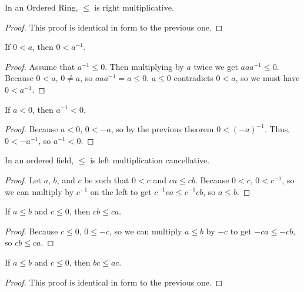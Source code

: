 \documentclass[../../math.tex]{subfiles}
\begin{document}
\begin{instance}
    In an Ordered Ring, $\leq$ is right multiplicative.
\end{instance}
\begin{proof}
    This proof is identical in form to the previous one.
\end{proof}

\begin{theorem}
    If $0 < a$, then $0 < a^{-1}$.
\end{theorem}
\begin{proof}
    Assume that $a^{-1} \leq 0$. Then multiplying by $a$ twice we get $aaa^{-1}
    \leq 0$.  Because $0 < a$, $0 \neq a$, so $aaa^{-1} = a \leq 0$.  $a \leq 0$
    contradicts $0 < a$, so we must have $0 < a^{-1}$.
\end{proof}

\begin{theorem}
    If $a < 0$, then $a^{-1} < 0$.
\end{theorem}
\begin{proof}
    Because $a < 0$, $0 < -a$, so by the previous theorem $0 < (-a)^{-1}$.
    Thus, $0 < -a^{-1}$, so $a^{-1} < 0$.
\end{proof}

\begin{instance}
    In an ordered field, $\leq$ is left multiplication cancellative.
\end{instance}
\begin{proof}
    Let $a$, $b$, and $c$ be such that $0 < c$ and $ca \leq cb$.  Because $0 <
    c$, $0 < c^{-1}$, so we can multiply by $c^{-1}$ on the left to get
    $c^{-1}ca \leq c^{-1}cb$, so $a \leq b$.
\end{proof}

\begin{theorem} \label{le_lmult_neg}
    If $a \leq b$ and $c \leq 0$, then $cb \leq ca$.
\end{theorem}
\begin{proof}
    Because $c \leq 0$, $0 \leq -c$, so we can multiply $a \leq b$ by $-c$ to
    get $-ca \leq -cb$, so $cb \leq ca$.
\end{proof}

\begin{theorem} \label{le_rmult_neg}
    If $a \leq b$ and $c \leq 0$, then $bc \leq ac$.
\end{theorem}
\begin{proof}
    This proof is identical in form to the previous one.
\end{proof}
\end{document}
